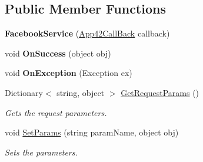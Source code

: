 \subsection*{Public Member Functions}
\begin{DoxyCompactItemize}
\item 
\hypertarget{classcom_1_1shephertz_1_1app42_1_1paas_1_1sdk_1_1csharp_1_1social_1_1_facebook_service_a46816adce115610f90432b9cc4db8f25}{{\bfseries Facebook\+Service} (\hyperlink{interfacecom_1_1shephertz_1_1app42_1_1paas_1_1sdk_1_1csharp_1_1_app42_call_back}{App42\+Call\+Back} callback)}\label{classcom_1_1shephertz_1_1app42_1_1paas_1_1sdk_1_1csharp_1_1social_1_1_facebook_service_a46816adce115610f90432b9cc4db8f25}

\item 
\hypertarget{classcom_1_1shephertz_1_1app42_1_1paas_1_1sdk_1_1csharp_1_1social_1_1_facebook_service_a59e67303684474110bbd7ab222668778}{void {\bfseries On\+Success} (object obj)}\label{classcom_1_1shephertz_1_1app42_1_1paas_1_1sdk_1_1csharp_1_1social_1_1_facebook_service_a59e67303684474110bbd7ab222668778}

\item 
\hypertarget{classcom_1_1shephertz_1_1app42_1_1paas_1_1sdk_1_1csharp_1_1social_1_1_facebook_service_ae2f0254ca00dfff980ff8302079e4d6b}{void {\bfseries On\+Exception} (Exception ex)}\label{classcom_1_1shephertz_1_1app42_1_1paas_1_1sdk_1_1csharp_1_1social_1_1_facebook_service_ae2f0254ca00dfff980ff8302079e4d6b}

\item 
Dictionary$<$ string, object $>$ \hyperlink{classcom_1_1shephertz_1_1app42_1_1paas_1_1sdk_1_1csharp_1_1social_1_1_facebook_service_aa5ed51234abf3cfd2468ab729cf8250c}{Get\+Request\+Params} ()
\begin{DoxyCompactList}\small\item\em Gets the request parameters. \end{DoxyCompactList}\item 
void \hyperlink{classcom_1_1shephertz_1_1app42_1_1paas_1_1sdk_1_1csharp_1_1social_1_1_facebook_service_aa43ea4e7a5c42a66d01f86bc13574015}{Set\+Params} (string param\+Name, object obj)
\begin{DoxyCompactList}\small\item\em Sets the parameters. \end{DoxyCompactList}\end{DoxyCompactItemize}
